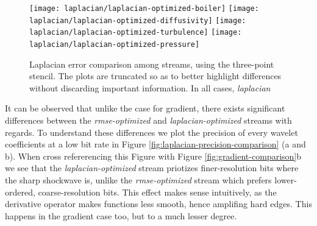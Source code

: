 \begin{figure}[h]
	\centering
	{\texttt{[image: laplacian/laplacian-optimized-boiler]}}
	{\texttt{[image: laplacian/laplacian-optimized-diffusivity]}}
	{\texttt{[image: laplacian/laplacian-optimized-turbulence]}}
	{\texttt{[image: laplacian/laplacian-optimized-pressure]}}
	\caption{Laplacian error comparison among streams, using the three-point stencil. The plots are
	truncated so as to better highlight differences without discarding important information. In all cases, \emph{laplacian}}
	\label{fig:laplacian-error-comparison}
\end{figure}

It can be observed that unlike the case for gradient, there exists significant differences between
the \emph{rmse-optimized} and \emph{laplacian-optimized} streams with regards. To understand these
differences we plot the precision of every wavelet coefficients at a low bit rate in Figure
\ref{fig:laplacian-precision-comparison} (a and b). When cross refererencing this Figure with Figure
\ref{fig:gradient-comparison}b we see that the \emph{laplacian-optimized} stream priotizes
finer-resolution bits where the sharp shockwave is, unlike the \emph{rmse-optimized} stream which
prefers lower-ordered, coarse-resolution bits. This effect makes sense intuitively, as the
derivative operator makes functions less smooth, hence amplifing hard edges. This happens in the
gradient case too, but to a much lesser degree.

